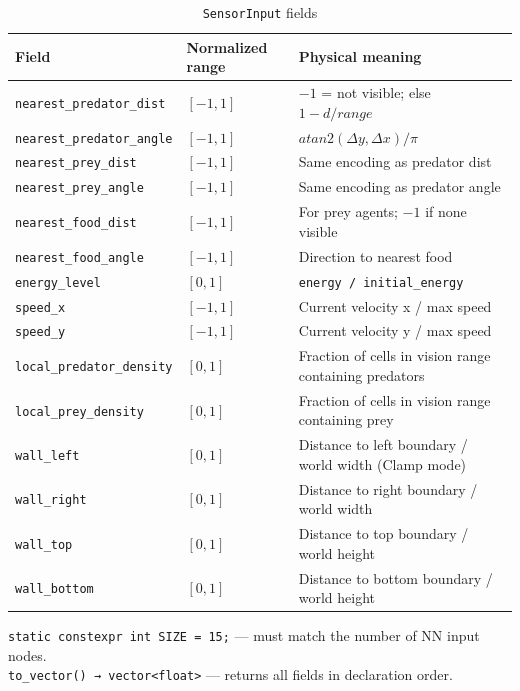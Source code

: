 \begin{table}[H]
\centering\small
\caption{\texttt{SensorInput} fields}
\begin{tabularx}{\textwidth}{@{}llX@{}}
\toprule
\textbf{Field} & \textbf{Normalized range} & \textbf{Physical meaning} \\
\midrule
\texttt{nearest\_predator\_dist}    & $[-1, 1]$ & $-1$ = not visible; else $1 - d/\mathit{range}$ \\
\texttt{nearest\_predator\_angle}   & $[-1, 1]$ & $\mathit{atan2}(\Delta y, \Delta x)/\pi$ \\
\texttt{nearest\_prey\_dist}        & $[-1, 1]$ & Same encoding as predator dist \\
\texttt{nearest\_prey\_angle}       & $[-1, 1]$ & Same encoding as predator angle \\
\texttt{nearest\_food\_dist}        & $[-1, 1]$ & For prey agents; $-1$ if none visible \\
\texttt{nearest\_food\_angle}       & $[-1, 1]$ & Direction to nearest food \\
\texttt{energy\_level}              & $[0, 1]$ & \texttt{energy / initial\_energy} \\
\texttt{speed\_x}                   & $[-1, 1]$ & Current velocity x / max speed \\
\texttt{speed\_y}                   & $[-1, 1]$ & Current velocity y / max speed \\
\texttt{local\_predator\_density}   & $[0, 1]$ & Fraction of cells in vision range containing predators \\
\texttt{local\_prey\_density}       & $[0, 1]$ & Fraction of cells in vision range containing prey \\
\texttt{wall\_left}                 & $[0, 1]$ & Distance to left boundary / world width (Clamp mode) \\
\texttt{wall\_right}                & $[0, 1]$ & Distance to right boundary / world width \\
\texttt{wall\_top}                  & $[0, 1]$ & Distance to top boundary / world height \\
\texttt{wall\_bottom}               & $[0, 1]$ & Distance to bottom boundary / world height \\
\bottomrule
\end{tabularx}
\end{table}

\texttt{static constexpr int SIZE = 15;} — must match the number of NN input nodes.\\
\texttt{to\_vector() → vector<float>} — returns all fields in declaration order.

